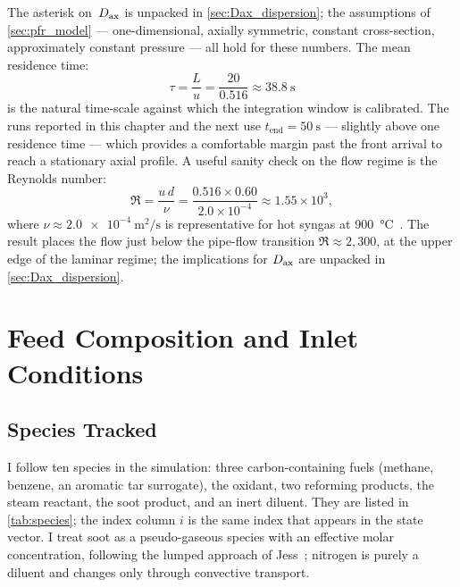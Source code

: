 The asterisk on~\(D_{\mathrm{ax}}\) is unpacked in \cref{sec:Dax_dispersion}; the assumptions of \cref{sec:pfr_model} --- one-dimensional, axially symmetric, constant cross-section, approximately constant pressure --- all hold for these numbers. The mean residence time:
%
\begin{equation}
  \tau = \frac{L}{u} = \frac{20}{0.516} \approx \SI{38.8}{\second}
  \label{eq:residence_time}
\end{equation}
%
is the natural time-scale against which the integration window is calibrated. The runs reported in this chapter and the next use \(t_{\mathrm{end}} = \SI{50}{\second}\) --- slightly above one residence time --- which provides a comfortable margin past the front arrival to reach a stationary axial profile. A useful sanity check on the flow regime is the Reynolds number:
%
\begin{equation}
  \Re = \frac{u\,d}{\nu}
      = \frac{0.516 \times 0.60}{2.0\times 10^{-4}}
      \approx 1.55 \times 10^{3},
  \label{eq:reynolds_reactor}
\end{equation}
%
where \(\nu \approx \SI{2.0e-4}{\metre\squared\per\second}\) is representative for hot syngas at \SI{900}{\degreeCelsius}~\cite{Fogler2006}. The result places the flow just below the pipe-flow transition \(\Re \approx 2{,}300\), at the upper edge of the laminar regime; the implications for \(D_{\mathrm{ax}}\) are unpacked in \cref{sec:Dax_dispersion}.

\section{Feed Composition and Inlet Conditions}\label{sec:feed}

\subsection{Species Tracked}\label{ssec:species_list}

I follow ten species in the simulation: three carbon-containing fuels (methane, benzene, an aromatic tar surrogate), the oxidant, two reforming products, the steam reactant, the soot product, and an inert diluent. They are listed in \cref{tab:species}; the index column \(i\) is the same index that appears in the state vector. I treat soot as a pseudo-gaseous species with an effective molar concentration, following the lumped approach of Jess~\cite{Jess1996}; nitrogen is purely a diluent and changes only through convective transport.

